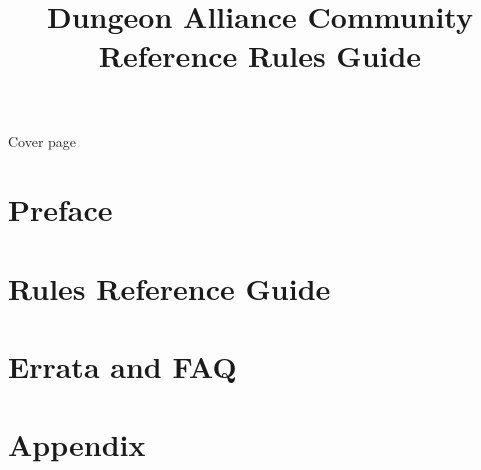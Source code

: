 

\title{Dungeon Alliance Community Reference Rules Guide} %
\sloppy

Cover page


\clearpage
\section{Preface}
\label{sec:Preface}


\newpage
\setcounter{secnumdepth}{4}
\setcounter{tocdepth}{2}
\tableofcontents

\clearpage
\section{Rules Reference Guide}
\label{sec:RulesReferenceGuide}


\clearpage
\section{Errata and FAQ}
\label{sec:ErrataAndFAQ}


\clearpage
\section{Appendix}
\label{sec:Appendix}


\clearpage
\onecolumn
\printindex

